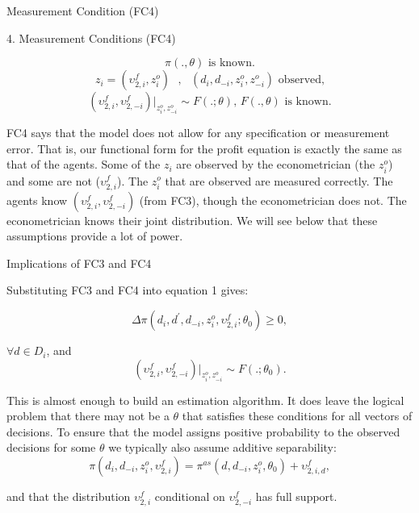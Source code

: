 \begin{frame}{Measurement Condition (FC4)}

4. Measurement Conditions (FC4)


\begin{equation*}
\pi (.,\theta )\text{ is known.}
\end{equation*}%
\begin{equation*}
z_{i}=(\upsilon _{2,i}^{f},z_{i}^{o})\text{ },\text{ }%
(d_{i},d_{-i},z_{i}^{o},z_{-i}^{o})\text{ observed,}
\end{equation*}%
\begin{equation*}
(\upsilon _{2,i}^{f},\upsilon _{2,-i}^{f})|_{z_{i}^{o},z_{-i}^{o}}\sim
F(.;\theta )\text{, }F(.,\theta )\text{ is known.}
\end{equation*}

FC4 says that the model does not allow for any specification or measurement
error. That is, our functional form for the profit equation is exactly the
same as that of the agents. Some of the $z_{i}$ are observed by the
econometrician (the $z_{i}^{o}$) and some are not ($\upsilon _{2,i}^{f}$).
The $z_{i}^{o}$ that are observed are measured correctly. The agents know $%
(\upsilon _{2,i}^{f},\upsilon _{2,-i}^{f})$ (from FC3), though the
econometrician does not. The econometrician knows their joint distribution.
We will see below that these assumptions provide a lot of power.
\end{frame}

\begin{frame}{Implications of FC3 and FC4}

Substituting FC3 and FC4 into equation 1 gives:

\begin{equation*}
\Delta \pi (d_{i},d^{\prime },d_{-i},z_{i}^{o},\upsilon _{2,i}^{f};\theta
_{0})\geq 0,
\end{equation*}

$\forall d\in D_{i}$, and%
\begin{equation*}
(\upsilon _{2,i}^{f},\upsilon _{2,-i}^{f})|_{z_{i}^{o},z_{-i}^{o}}\sim
F(.;\theta _{0}).
\end{equation*}

This is almost enough to build an estimation algorithm. It does leave the
logical problem that there may not be a $\theta $ that satisfies these
conditions for all vectors of decisions. To ensure that the model assigns
positive probability to the observed decisions for some $\theta $ we
typically also assume additive separability:%
\begin{equation*}
\pi (d_{i},d_{-i},z_{i}^{o},\upsilon _{2,i}^{f})=\pi
^{as}(d,d_{-i},z_{i}^{o},\theta _{0})+\upsilon _{2,i,d}^{f},
\end{equation*}

and that the distribution $\upsilon _{2,i}^{f}$ conditional on $\upsilon
_{2,-i}^{f}$ has full support.


\end{frame}

